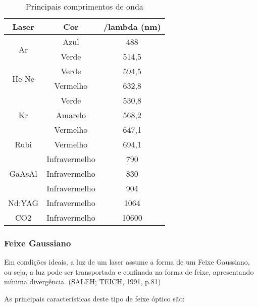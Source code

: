 \begin{table}[ht!]
	\caption{Principais comprimentos de onda}
	\label{tab:comp_onda}
	\begin{tabular}{c|c|c}
		\hline
		Laser & Cor & /lambda (nm)\\
		\hline
		\multirow{2}{*}{Ar} & Azul & 488\\
		\cline{2-3}
		& Verde & 514,5\\
		\hline
		\multirow{2}{*}{He-Ne} & Verde & 594,5\\
		\cline{2-3}
		& Vermelho & 632,8\\
		\hline
		\multirow{3}{*}{Kr} & Verde & 530,8\\
		\cline{2-3}
		& Amarelo & 568,2\\
		\cline{2-3}
		& Vermelho & 647,1\\
		\hline
		Rubi & Vermelho & 694,1\\
		\hline
		\multirow{3}{*}{GaAsAl} & Infravermelho & 790\\
		\cline{2-3}
		& Infravermelho & 830\\
		\cline{2-3}
		& Infravermelho & 904\\
		\hline
		Nd:YAG & Infravermelho & 1064\\
		\hline
		CO2 & Infravermelho & 10600\\
		\hline
	\end{tabular}
\end{table}

\subsubsection{Feixe Gaussiano}

Em condições ideais, a luz de um laser assume a forma de um Feixe Gaussiano, ou seja, a luz pode ser transportada e confinada na forma de feixe, apresentando mínima divergência. (SALEH; TEICH, 1991, p.81)

As principais características deste tipo de feixe óptico são:

